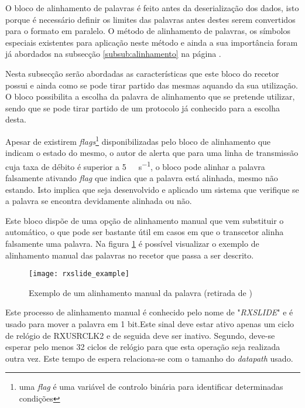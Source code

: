 O bloco de alinhamento de palavras é feito antes da deserialização dos dados, isto porque é necessário definir os limites das palavras antes destes serem convertidos para o formato em paralelo. O método de alinhamento de palavras, os símbolos especiais existentes para aplicação neste método e ainda a sua importância foram já abordados na subsecção \ref{subsub:alinhamento} na página \pageref{subsub:alinhamento}.

Nesta subsecção serão abordadas as características que este bloco do recetor possui e ainda como se pode tirar partido das mesmas aquando da sua utilização. O bloco possibilita a escolha da palavra de alinhamento que se pretende utilizar, sendo que se pode tirar partido de um protocolo já conhecido para a escolha desta.

Apesar de existirem \textit{flags}\footnote{uma \textit{flag} é uma variável de controlo binária para identificar determinadas condições} disponibilizadas pelo bloco de alinhamento que indicam o estado do mesmo, o autor de \cite{R011} alerta que para uma linha de transmissão cuja taxa de débito é superior a \SI{5}{\giga\bit\per\second}, o bloco pode alinhar a palavra falsamente ativando \textit{flag} que indica que a palavra está alinhada, mesmo não estando. Isto implica que seja desenvolvido e aplicado um sistema que verifique se a palavra se encontra devidamente alinhada ou não.


Este bloco dispõe de uma opção de alinhamento manual que vem substituir o automático, o que pode ser bastante útil em casos em que o transcetor alinha falsamente uma palavra. Na figura \ref{fig:rxslide_example} é possível visualizar o exemplo de alinhamento manual das palavras no recetor que passa a ser descrito.

\begin{figure}[h!]
	\begin{center}
		\leavevmode
		\texttt{[image: rxslide\_example]}
		\captionsetup{width=1.0\linewidth}
		\caption[Exemplo de um alinhamento manual da palavra]{Exemplo de um alinhamento manual da palavra (retirada de \cite{R011})}
		\label{fig:rxslide_example}
	\end{center}
\end{figure}

Este processo de alinhamento manual é conhecido pelo nome de "\textit{RXSLIDE}" e é usado para mover a palavra em 1 bit.Este sinal deve estar ativo apenas um ciclo de relógio de RXUSRCLK2 e de seguida deve ser inativo. Segundo, \cite{R011} deve-se esperar pelo menos 32 ciclos de relógio para que esta operação seja realizada outra vez. Este tempo de espera relaciona-se com o tamanho do \textit{datapath} usado.

